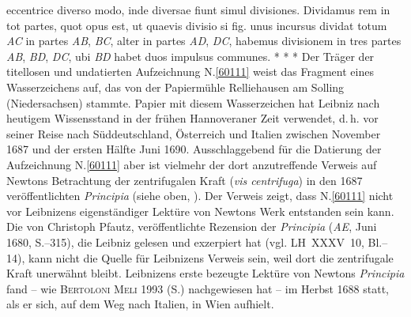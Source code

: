eccentrice diverso modo,%
inde diversae fiunt simul divisiones.%
Dividamus rem in tot partes,
quot opus est,
ut quaevis divisio%
si fig.\;%
unus incursus dividat totum \textit{AC}%
in partes \textit{AB}, \textit{BC},
alter in partes \textit{AD}, \textit{DC},
habemus divisionem in tres partes
\textit{AB}, \textit{BD}, \textit{DC},
ubi \textit{BD} habet duos impulsus communes.%
\pend%
\newpage%
\pstart%
\noindent%
\centering%
*     *     *
\pend%
\vspace{2.5em}%
%
\frenchspacing%
\footnotesize%
\pstart%
\noindent%
%
Der Träger der titellosen und undatierten Aufzeichnung N.\;\ref{60111} weist das Fragment eines Wasserzeichens auf, das von der Papiermühle Relliehausen am Solling (Niedersachsen) stammte. %
Papier mit diesem Wasserzeichen hat Leibniz nach heutigem Wissensstand in der frühen Hannoveraner Zeit verwendet, d.\,h. vor seiner Reise nach Süddeutschland, Österreich und Italien zwischen November 1687 und der ersten Hälfte Juni 1690.
Ausschlaggebend für die Datierung der Aufzeichnung N.\;\ref{60111} aber ist vielmehr der dort anzutreffende Verweis auf Newtons Betrachtung der zentrifugalen Kraft (\textit{vis centrifuga}) in den 1687 veröffentlichten \textit{Principia}\cite{00535} (siehe oben, ).
Der Verweis zeigt, dass N.\;\ref{60111} nicht vor Leibnizens eigenständiger Lektüre von Newtons Werk entstanden sein kann.
Die von Christoph Pfautz, veröffentlichte Rezension\cite{01356} der \textit{Principia}\cite{00535} (\textit{AE},\cite{01023} Juni 1680, S.--315), die Leibniz gelesen und exzerpiert hat (vgl. LH~XXXV~10, Bl.--14), kann nicht die Quelle für Leibnizens Verweis sein, weil dort die zentrifugale Kraft unerwähnt bleibt.
\pend%
\pstart%
Leibnizens erste bezeugte Lektüre von Newtons \textit{Principia}\cite{00535} fand -- wie \textsc{Bertoloni Meli} 1993\cite{01357} (S.) nachgewiesen hat -- im Herbst 1688 statt, als er sich, auf dem Weg nach Italien, in Wien aufhielt.
